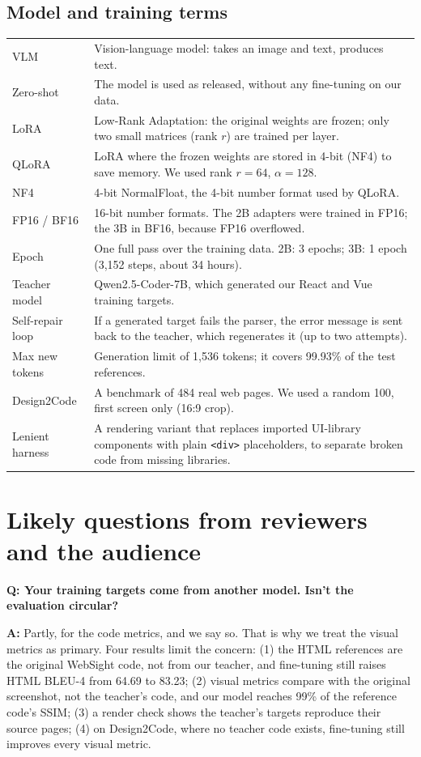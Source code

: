 \documentclass[11pt,a4paper]{article}
\newcommand{\q}[1]{\par\medskip\noindent\textbf{\color{navy}Q: #1}\par}
\newcommand{\ans}{\noindent\textbf{A:} }
\begin{document}
\subsection*{Model and training terms}
\begin{tabularx}{\linewidth}{@{}p{3.1cm}X@{}}
\toprule
VLM & Vision-language model: takes an image and text, produces text. \\
Zero-shot & The model is used as released, without any fine-tuning on our data. \\
LoRA & Low-Rank Adaptation: the original weights are frozen; only two small matrices (rank $r$) are trained per layer. \\
QLoRA & LoRA where the frozen weights are stored in 4-bit (NF4) to save memory. We used rank $r=64$, $\alpha=128$. \\
NF4 & 4-bit NormalFloat, the 4-bit number format used by QLoRA. \\
FP16 / BF16 & 16-bit number formats. The 2B adapters were trained in FP16; the 3B in BF16, because FP16 overflowed. \\
Epoch & One full pass over the training data. 2B: 3 epochs; 3B: 1 epoch (3,152 steps, about 34 hours). \\
Teacher model & Qwen2.5-Coder-7B, which generated our React and Vue training targets. \\
Self-repair loop & If a generated target fails the parser, the error message is sent back to the teacher, which
regenerates it (up to two attempts). \\
Max new tokens & Generation limit of 1,536 tokens; it covers 99.93\% of the test references. \\
Design2Code & A benchmark of 484 real web pages. We used a random 100, first screen only (16:9 crop). \\
Lenient harness & A rendering variant that replaces imported UI-library components with plain \texttt{<div>}
placeholders, to separate broken code from missing libraries. \\
\bottomrule
\end{tabularx}

\section{Likely questions from reviewers and the audience}

\q{Your training targets come from another model. Isn't the evaluation circular?}
\ans Partly, for the code metrics, and we say so. That is why we treat the visual metrics as primary. Four results
limit the concern: (1) the HTML references are the original WebSight code, not from our teacher, and fine-tuning still
raises HTML BLEU-4 from 64.69 to 83.23; (2) visual metrics compare with the original screenshot, not the teacher's code,
and our model reaches 99\% of the reference code's SSIM; (3) a render check shows the teacher's targets reproduce their
source pages; (4) on Design2Code, where no teacher code exists, fine-tuning still improves every visual metric.
\end{document}
